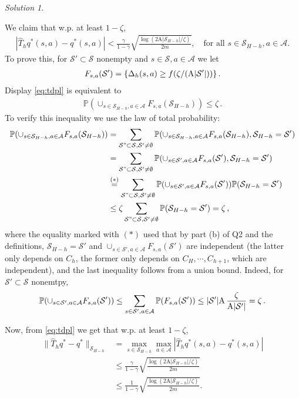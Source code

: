 \documentclass{article}
\DeclareMathOperator*{\1}{\mathbbm{1}}
\newcommand{\Prob}[1]{\mathbb{P}( #1 )}
\newcommand{\0}{\mathbf{0}}
\theoremstyle{definition}
\theoremstyle{remark}
\newtheorem*{solution*}{Solution}
\newcommand{\cS}{\mathcal{S}}
\newcommand{\cA}{\mathcal{A}}
\begin{document}
\begin{solution*}
\begin{enumerate}
We claim that w.p. at least $1 - \zeta$,
\begin{align}
  \left| \hat{T}_h q^*(s, a) - q^*(s, a) \right| < \frac{\gamma}{1 - \gamma} \sqrt{\frac{\log(2 \mathrm{A} |\mathcal{S}_{H-h}|/ \zeta)}{2m}}, \quad \text{for all } s\in \cS_{H-h}, a\in \cA.
  \label{eq:tdpl}
\end{align}
To prove this, for $\cS'\subset \cS$ nonempty and
$s\in \cS,a\in \cA$ we let
\begin{align*}
F_{s,a}(\cS') = \{ \Delta_h(s,a)\ge f(\zeta/(\nA|\cS'|)) \}\,.
\end{align*}
Display \eqref{eq:tdpl} is equivalent to 
\begin{align*}
\Prob{ \cup_{s\in \cS_{H-h},a\in \cA} F_{s,a}(\cS_{H-h}) } \le \zeta\,.
\end{align*}
To verify this inequality we use the law of total probability:
\begin{align*}
\Prob{ \cup_{s\in \cS_{H-h},a\in \cA} F_{s,a}(\cS_{H-h}) }
&=
\sum_{\cS"\subset \cS,\cS'\ne\emptyset}
\Prob{ \cup_{s\in \cS_{H-h},a\in \cA} F_{s,a}(\cS_{H-h}), \cS_{H-h}=\cS' } \\
&=
\sum_{\cS"\subset \cS,\cS'\ne\emptyset}
\Prob{ \cup_{s\in \cS',a\in \cA} F_{s,a}(\cS'), \cS_{H-h}=\cS' } \\
&\stackrel{(*)}{=}
\sum_{\cS"\subset \cS,\cS'\ne\emptyset}
\Prob{ \cup_{s\in \cS',a\in \cA} F_{s,a}(\cS')} \Prob{ \cS_{H-h}=\cS' }   \\
&\le
\zeta \sum_{\cS"\subset \cS,\cS'\ne\emptyset}
\Prob{ \cS_{H-h}=\cS' }    = \zeta\,,
\end{align*}
where the 
equality marked with $(*)$ used that
by part (b) of Q2 and the definitions,
$\cS_{H-h}=\cS'$ and $\cup_{s\in \cS',a\in \cA} F_{s,a}(\cS')$ are independent (the latter only depends on $C_h$, the former only depends on $C_H,\cdots,C_{h+1}$, which are independent),
and
the 
last inequality follows from a union bound.
Indeed, for $\cS'\subset \cS$ nonemtpy,
\begin{align*}
\Prob{\cup_{s\in \cS',a\in \cA} F_{s,a}(\cS')}
\le
\sum_{s\in \cS',a\in \cA} \Prob{ F_{s,a}(\cS')}
\le |\cS'| \nA \, \frac{\zeta}{\nA|\cS'|} = \zeta\,.
\end{align*}

Now, from \eqref{eq:tdpl} 
we get that w.p. at least $1 - \zeta$,
  \begin{align*}
    \|\hat{T}_h q^* - q^*\|_{\mathcal{S}_{H-h}} &= \max_{s \in \mathcal{S}_{H-h} } \max_{a \in \mathcal{A}} \left| \hat{T}_h q^*(s, a) - q^*(s, a) \right| \\
    &\leq \frac{\gamma}{1 - \gamma} \sqrt{\frac{\log(2 \mathrm{A} |\mathcal{S}_{H-h}|/ \zeta)}{2m}} \\
    & \leq \frac{1}{1 - \gamma} \sqrt{\frac{\log(2 \mathrm{A} |\mathcal{S}_{H-h}|/ \zeta)}{2m}}.
  \end{align*}
  

\end{enumerate}
\end{solution*}
\end{document}

